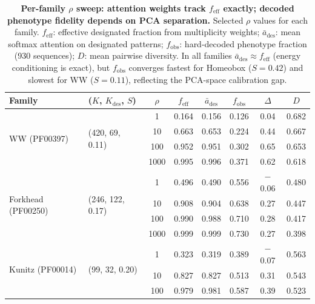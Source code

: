 \documentclass{article}
\theoremstyle{definition}
\theoremstyle{remark}
\begin{document}
\begin{table}[p]
  \centering
  \caption{\textbf{Per-family $\rho$ sweep: attention weights track
  $f_{\mathrm{eff}}$ exactly; decoded phenotype fidelity depends on PCA
  separation.} Selected $\rho$ values for each family.
  $f_{\mathrm{eff}}$: effective designated fraction from multiplicity weights;
  $\bar{a}_{\mathrm{des}}$: mean softmax attention on designated patterns;
  $f_{\mathrm{obs}}$: hard-decoded phenotype fraction (930 sequences);
  $D$: mean pairwise diversity.
  In all families $\bar{a}_{\mathrm{des}} \approx f_{\mathrm{eff}}$
  (energy conditioning is exact), but $f_{\mathrm{obs}}$ converges fastest
  for Homeobox ($S=0.42$) and slowest for WW ($S=0.11$), reflecting the
  PCA-space calibration gap.}
  \label{tab:per-family-rho}
  \small
  \begin{tabular}{llcccccc}
    \toprule
    Family & ($K$, $K_{\mathrm{des}}$, $S$)
      & $\rho$ & $f_{\mathrm{eff}}$ & $\bar{a}_{\mathrm{des}}$
      & $f_{\mathrm{obs}}$ & $\Delta$ & $D$ \\
    \midrule
    \multirow{4}{*}{WW (PF00397)}
      & \multirow{4}{*}{(420, 69, 0.11)}
      &    1 & 0.164 & 0.156 & 0.126 & 0.04 & 0.682 \\
    & &   10 & 0.663 & 0.653 & 0.224 & 0.44 & 0.667 \\
    & &  100 & 0.952 & 0.951 & 0.302 & 0.65 & 0.653 \\
    & & 1000 & 0.995 & 0.996 & 0.371 & 0.62 & 0.618 \\
    \midrule
    \multirow{4}{*}{Forkhead (PF00250)}
      & \multirow{4}{*}{(246, 122, 0.17)}
      &    1 & 0.496 & 0.490 & 0.556 & $-$0.06 & 0.480 \\
    & &   10 & 0.908 & 0.904 & 0.638 & 0.27 & 0.447 \\
    & &  100 & 0.990 & 0.988 & 0.710 & 0.28 & 0.417 \\
    & & 1000 & 0.999 & 0.999 & 0.730 & 0.27 & 0.398 \\
    \midrule
    \multirow{4}{*}{Kunitz (PF00014)}
      & \multirow{4}{*}{(99, 32, 0.20)}
      &    1 & 0.323 & 0.319 & 0.389 & $-$0.07 & 0.563 \\
    & &   10 & 0.827 & 0.827 & 0.513 & 0.31 & 0.543 \\
    & &  100 & 0.979 & 0.981 & 0.587 & 0.39 & 0.523 \\

\end{tabular}
\end{table}
\end{document}

